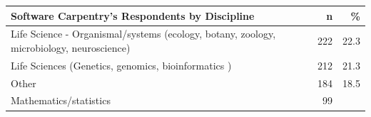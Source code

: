 \documentclass[]{article}
\begin{document}
\begin{longtable}[]{@{}lrr@{}}
\toprule
\begin{minipage}[b]{0.81\columnwidth}\raggedright\strut
Software Carpentry's Respondents by Discipline\strut
\end{minipage} & \begin{minipage}[b]{0.05\columnwidth}\raggedleft\strut
n\strut
\end{minipage} & \begin{minipage}[b]{0.05\columnwidth}\raggedleft\strut
\%\strut
\end{minipage}\tabularnewline
\midrule
\endhead
\begin{minipage}[t]{0.81\columnwidth}\raggedright\strut
Life Science - Organismal/systems (ecology, botany, zoology,
microbiology, neuroscience)\strut
\end{minipage} & \begin{minipage}[t]{0.05\columnwidth}\raggedleft\strut
222\strut
\end{minipage} & \begin{minipage}[t]{0.05\columnwidth}\raggedleft\strut
22.3\strut
\end{minipage}\tabularnewline
\begin{minipage}[t]{0.81\columnwidth}\raggedright\strut
Life Sciences (Genetics, genomics, bioinformatics )\strut
\end{minipage} & \begin{minipage}[t]{0.05\columnwidth}\raggedleft\strut
212\strut
\end{minipage} & \begin{minipage}[t]{0.05\columnwidth}\raggedleft\strut
21.3\strut
\end{minipage}\tabularnewline
\begin{minipage}[t]{0.81\columnwidth}\raggedright\strut
Other\strut
\end{minipage} & \begin{minipage}[t]{0.05\columnwidth}\raggedleft\strut
184\strut
\end{minipage} & \begin{minipage}[t]{0.05\columnwidth}\raggedleft\strut
18.5\strut
\end{minipage}\tabularnewline
\begin{minipage}[t]{0.81\columnwidth}\raggedright\strut
Mathematics/statistics\strut
\end{minipage} & \begin{minipage}[t]{0.05\columnwidth}\raggedleft\strut
99\strut
\end{minipage} & \begin{minipage}[t]{0.05\columnwidth}\raggedleft\strut

\end{minipage}
\end{longtable}
\end{document}
